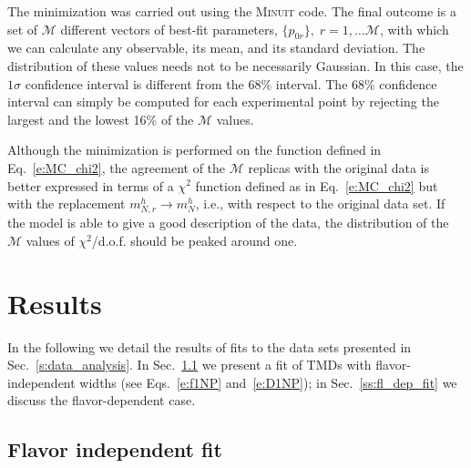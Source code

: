 \documentclass[aps,preprintnumbers,showpacs,nofootinbib,superscriptaddress,floatfix]{revtex4}
\newcommand{\minuit}{\textsc{Minuit }}
\begin{document}
The minimization was carried out using the \minuit  code. The final outcome is a set of $\mathcal{M}$ different vectors of best-fit parameters, $\{ p_{0r}\},\; r=1,\ldots \mathcal{M}$, with which we can calculate any observable, its mean, and its standard deviation. 
The distribution of these values needs not to be necessarily Gaussian. In this
case, the $1 \sigma$ confidence interval is different from the 68\%
interval. The 68\% confidence interval can simply be computed for
each experimental point by rejecting the largest and the lowest 16\% of the
$\mathcal{M}$ values.   

Although the minimization is performed on the function defined in Eq.~\eqref{e:MC_chi2}, the agreement of the $\mathcal{M}$ replicas with the original data is better expressed in terms of a $\chi^2$ function defined as in Eq.~\eqref{e:MC_chi2} but with the replacement $m_{N, r}^{h} \to m_{N}^{h}$, i.e.,  with respect to the original data set.
If the model is able to give a good description of the data, the distribution of the $\mathcal{M}$ values of $\chi^2$/d.o.f. should be peaked around one. 










\newpage
\section{Results}
\label{s:results}

In the following we detail the results of fits to the data sets presented in Sec.~\ref{s:data_analysis}. In Sec.~\ref{ss:fl_ind_fit} we present a fit of TMDs with flavor-independent widths (see Eqs.~\eqref{e:f1NP} and~\eqref{e:D1NP}); in Sec.~\ref{ss:fl_dep_fit} we discuss the flavor-dependent case.


\subsection{Flavor independent fit}
\label{ss:fl_ind_fit}
\end{document}
